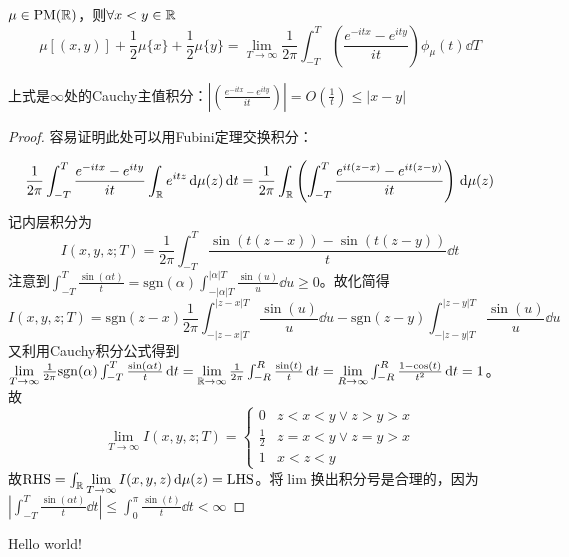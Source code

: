 \documentclass{ctexbook}
\begin{document}
\begin{Thm}
  $\mu\in \mathrm{PM}(\mathbb{R})$，则$\forall x<y \in \mathbb{R}$
\begin{equation}
  \mu[(x,y)]+\frac{1}{2}\mu\{x\}+\frac{1}{2}\mu\{y\}=\lim_{T\to\infty}\frac{1}{2\pi}\int_{-T}^T \left( \frac{e^{-itx}-e^{ity}}{it} \right)\phi_{\mu}(t)\dd T
  \end{equation}
\end{Thm}
\begin{Rmk}
  上式是$\infty$处的Cauchy主值积分：$|\left( \frac{e^{-itx}-e^{ity}}{it} \right)|=O(\frac{1}{t})\leq |x-y|$
\end{Rmk}
\begin{proof}
  容易证明此处可以用Fubini定理交换积分：
  
\begin{equation}
\frac{1}{2\pi}\int_{-T}^T \frac{e^{-itx}-e^{ity}}{it}\int_{\mathbb{R}}e^{itz}\,\mathrm{d}\mu(z)\,\mathrm{d} t =\frac{1}{2\pi}\int_{\mathbb{R}}\left( \int_{-T}^T \frac{e^{it(z-x)}-e^{it(z-y)}}{it} \right)\,\mathrm{d}\mu(z)
\end{equation}
记内层积分为
\begin{equation}
I(x,y,z;T)=\frac{1}{2\pi}\int_{-T}^T \frac{\sin(t(z-x))-\sin(t(z-y))}{t}\dd t
\end{equation}
注意到$\int_{-T}^T \frac{\sin(\alpha t)}{t}= \mathrm{sgn}(\alpha)\int_{-|\alpha|T}^{|\alpha| T}\frac{\sin(u)}{u}\dd u \geq 0$。故化简得
\begin{equation}
I(x,y,z;T)= \mathrm{sgn}(z-x) \frac{1}{2\pi}\int_{-|z-x|T}^{|z-x|T} \frac{\sin(u)}{u}\dd u- \mathrm{sgn}(z-y) \int_{-|z-y|T}^{|z-y|T} \frac{\sin(u)}{u}\dd u
\end{equation}
又利用Cauchy积分公式得到$\lim\limits_{T\to\infty} \frac{1}{2\pi} \mathrm{sgn}(\alpha)\int_{-T}^T \frac{\sin(\alpha t)}{t}\,\mathrm{d} t=\lim\limits_{\mathbb{R}\to\infty} \frac{1}{2\pi}\int_{-R}^R \frac{\sin(t)}{t}\,\mathrm{d} t=\lim\limits_{R\to\infty}\int_{-R}^R \frac{1-\cos(t)}{t^2}\,\mathrm{d} t=1$。故 
\begin{equation}
\lim_{T\to\infty}I(x,y,z;T)=
\begin{cases}
  0& z<x<y \lor z>y>x\\
  \frac{1}{2} & z=x<y \lor z=y>x\\
  1 & x<z<y
\end{cases}
\end{equation}
故$\mathrm{RHS}=\int_{\mathbb{R}}\lim\limits_{T\to\infty}I(x,y,z)\,\mathrm{d}\mu(z)= \mathrm{LHS}$。将$\lim$换出积分号是合理的，因为$|\int_{-T}^T \frac{\sin(\alpha t)}{t}\dd t|\leq \int_{0}^{\pi} \frac{\sin(t)}{t}\dd t<\infty$
\end{proof}

Hello world!
\end{document}

